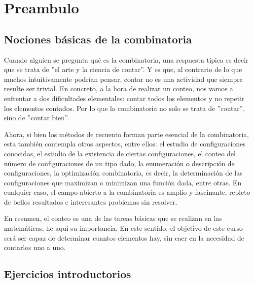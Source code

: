 
\section{Preambulo}

\subsection{Nociones básicas de la combinatoria}

Cuando alguien se pregunta qué es la combinatoria, una respuesta típica es decir que se trata de ''el arte y la ciencia de contar''. Y es que, al contrario de lo que muchos intuitivamente podrían pensar, contar no es una actividad que siempre resulte ser trivial. En concreto, a la hora de realizar un conteo, nos vamos a enfrentar a dos dificultades elementales: contar todos los elementos y no repetir los elementos contados. Por lo que la combinatoria no solo se trata de ''contar'', sino de ''contar bien''.

Ahora, si bien los métodos de recuento forman parte esencial de la combinatoria, esta también contempla otros aspectos, entre ellos: el estudio de configuraciones conocidas, el estudio de la existencia de ciertas configuraciones, el conteo del número de configuraciones de un tipo dado, la enumeración o descripción de configuraciones, la optimización combinatoria, es decir, la determinación de las configuraciones que maximizan o minimizan una función dada, entre otras. En cualquier caso, el campo abierto a la combinatoria es amplio y fascinante, repleto de bellos resultados e interesantes problemas sin resolver.

En resumen, el conteo es una de las tareas básicas que se realizan en las matemáticas, he aquí su importancia. En este sentido, el objetivo de este curso será ser capaz de determinar cuantos elementos hay, sin caer en la necesidad de contarlos uno a uno.

\subsection{Ejercicios introductorios}


